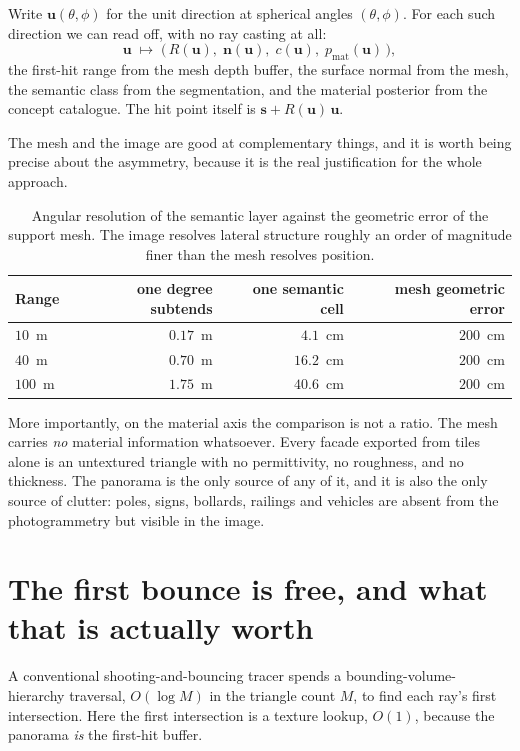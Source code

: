 \documentclass[11pt,a4paper]{article}
\newcommand{\bs}{\mathbf{s}}
\newcommand{\bu}{\mathbf{u}}
\newcommand{\bn}{\mathbf{n}}
\begin{document}
Write $\bu(\theta,\phi)$ for the unit direction at spherical angles
$(\theta,\phi)$. For each such direction we can read off, with no ray casting at
all:
\begin{equation}
  \bu \;\longmapsto\; \bigl(\, R(\bu),\; \bn(\bu),\; c(\bu),\; p_{\text{mat}}(\bu) \,\bigr),
\end{equation}
the first-hit range from the mesh depth buffer, the surface normal from the mesh,
the semantic class from the segmentation, and the material posterior from the
concept catalogue. The hit point itself is $\bs + R(\bu)\,\bu$.

The mesh and the image are good at complementary things, and it is worth being
precise about the asymmetry, because it is the real justification for the whole
approach.

\begin{table}[h]
\centering
\begin{tabular}{lrrr}
\toprule
Range & one degree subtends & one semantic cell & mesh geometric error \\
\midrule
$10$~m  & $0.17$~m & $4.1$~cm  & $200$~cm \\
$40$~m  & $0.70$~m & $16.2$~cm & $200$~cm \\
$100$~m & $1.75$~m & $40.6$~cm & $200$~cm \\
\bottomrule
\end{tabular}
\caption{Angular resolution of the semantic layer against the geometric error of
the support mesh. The image resolves lateral structure roughly an order of
magnitude finer than the mesh resolves position.}
\end{table}

More importantly, on the material axis the comparison is not a ratio. The mesh
carries \emph{no} material information whatsoever. Every facade exported from
tiles alone is an untextured triangle with no permittivity, no roughness, and no
thickness. The panorama is the only source of any of it, and it is also the only
source of clutter: poles, signs, bollards, railings and vehicles are absent from
the photogrammetry but visible in the image.

\section{The first bounce is free, and what that is actually worth}

A conventional shooting-and-bouncing tracer spends a bounding-volume-hierarchy
traversal, $O(\log M)$ in the triangle count $M$, to find each ray's first
intersection. Here the first intersection is a texture lookup, $O(1)$, because
the panorama \emph{is} the first-hit buffer.
\end{document}
